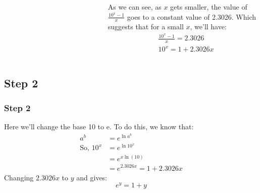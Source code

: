 \documentclass{beamer}
\begin{document}
\begin{frame}
\begin{columns}
\begin{table}[]
\begin{tabular}{|l|l|l|}
        \end{tabular}
    \end{table}
    \pause
    As we can see, as $x$ gets smaller, the value of $\frac{10^x-1}{x}$ goes to a constant value of 2.3026. Which suggests that for a small $x$, we'll have:
    \begin{equation}
        \begin{split}
            &\frac{10^x-1}{x} = 2.3026 \\
            &10^x = 1 + 2.3026x
        \end{split}
    \end{equation}
    \end{columns}
\end{frame}

\subsection{Step 2}
\begin{frame}
    \frametitle{Step 2}
    Here we'll change the base 10 to e. To do this, we know that:
    \begin{equation}
        \begin{split}
            a^b &= e^{\ln{a^b}}\\
            \text{So, } 10^x &= e^{\ln{10^x}}\\
            &=e^{x\ln(10)}\\
            &= e^{2.3026x} = 1+2.3026x
        \end{split}
    \end{equation}
Changing $2.3026x$ to $y$ and gives:
\begin{equation}
    \label{eq:5}
    e^y = 1 +y
\end{equation}
\end{frame}
\end{document}
